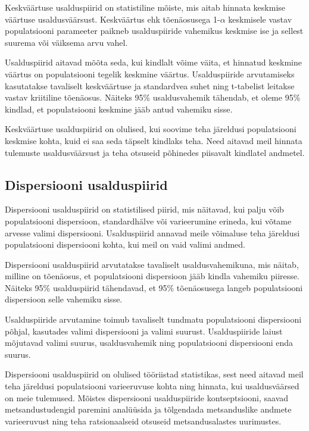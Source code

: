 \documentclass[
]{book}
\begin{document}
Keskväärtuse usalduspiirid on statistiline mõiste, mis aitab hinnata keskmise väärtuse usaldusväärsust. Keskväärtus ehk tõenäosusega 1-\(\alpha\) keskmisele vastav populatsiooni parameeter paikneb usalduspiiride vahemikus keskmise ise ja sellest suurema või väiksema arvu vahel.

Usalduspiirid aitavad mõõta seda, kui kindlalt võime väita, et hinnatud keskmine väärtus on populatsiooni tegelik keskmine väärtus. Usalduspiiride arvutamiseks kasutatakse tavaliselt keskväärtuse ja standardvea suhet ning t-tabelist leitakse vastav kriitiline tõenäosus. Näiteks 95\% usaldusvahemik tähendab, et oleme 95\% kindlad, et populatsiooni keskmine jääb antud vahemiku sisse.

Keskväärtuse usalduspiirid on olulised, kui soovime teha järeldusi populatsiooni keskmise kohta, kuid ei saa seda täpselt kindlaks teha. Need aitavad meil hinnata tulemuste usaldusväärsust ja teha otsuseid põhinedes piisavalt kindlatel andmetel.

\subsection{Dispersiooni usalduspiirid}\label{dispersiooni-usalduspiirid}

Dispersiooni usalduspiirid on statistilised piirid, mis näitavad, kui palju võib populatsiooni dispersioon, standardhälve või varieerumine erineda, kui võtame arvesse valimi dispersiooni. Usalduspiirid annavad meile võimaluse teha järeldusi populatsiooni dispersiooni kohta, kui meil on vaid valimi andmed.

Dispersiooni usalduspiirid arvutatakse tavaliselt usaldusvahemikuna, mis näitab, milline on tõenäosus, et populatsiooni dispersioon jääb kindla vahemiku piiresse. Näiteks 95\% usalduspiirid tähendavad, et 95\% tõenäosusega langeb populatsiooni dispersioon selle vahemiku sisse.

Usalduspiiride arvutamine toimub tavaliselt tundmatu populatsiooni dispersiooni põhjal, kasutades valimi dispersiooni ja valimi suurust. Usalduspiiride laiust mõjutavad valimi suurus, usaldusvahemik ning populatsiooni dispersiooni enda suurus.

Dispersiooni usalduspiirid on olulised tööriistad statistikas, sest need aitavad meil teha järeldusi populatsiooni varieeruvuse kohta ning hinnata, kui usaldusväärsed on meie tulemused. Mõistes dispersiooni usalduspiiride kontseptsiooni, saavad metsandustudengid paremini analüüsida ja tõlgendada metsanduslike andmete varieeruvust ning teha ratsionaalseid otsuseid metsandusalastes uurimustes.
\end{document}
